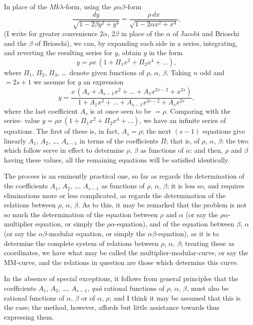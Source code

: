\documentclass[11pt,a4paper]{book}
\begin{document}
In place of the $Mk\lambda$-form, using the $\rho\alpha\beta$-form
\[
\frac{dy}{\sqrt{1 - 2\beta y^2 + y^4}} = \frac{\rho\, dx}{\sqrt{1 - 2\alpha x^2 + x^4}},
\]
(I write for greater convenience $2\alpha$, $2\beta$ in place of the $\alpha$ of Jacobi and Brioschi and
the $\beta$ of Brioschi), we can, by expanding each side in a series, integrating, and
reverting the resulting series for $y$, obtain $y$ in the form
\[
y = \rho x\, (1 + \Pi_1 x^2 + \Pi_2 x^4 + \ldots),
\]
where $\Pi_1$, $\Pi_2$, $\Pi_3$, \ldots\ denote given functions of $\rho$, $\alpha$, $\beta$. Taking $n$ odd and $= 2s + 1$
we assume for $y$ an expression
\[
y = \frac{x\, (A_s + A_{s-1} x^2 + \ldots + A_1 x^{2s-2} + x^{2s})}
{1 + A_1 x^2 + \ldots + A_{s-1} x^{2s-2} + A_s x^{2s}},
\]
where the last coefficient $A_s$ is at once seen to be $= \rho$. Comparing with the series-
value $y = \rho x\, (1 + \Pi_1 x^2 + \Pi_2 x^4 + \ldots)$, we have an infinite series of equations.
The first of these is, in fact, $A_s = \rho$; the next $(s-1)$ equations give linearly $A_1$, $A_2$, \ldots,
$A_{s-1}$ in terms of the coefficients $\Pi$; that is, of $\rho$, $\alpha$, $\beta$: the two which follow serve in
effect to determine $\rho$, $\beta$ as functions of $\alpha$: and then, $\rho$ and $\beta$ having these values,
all the remaining equations will be satisfied identically.

The process is an eminently practical one, so far as regards the determination
of the coefficients $A_1$, $A_2$, \ldots, $A_{s-1}$ as functions of $\rho$, $\alpha$, $\beta$; it is less so, and requires
eliminations more or less complicated, as regards the determination of the relations
between $\rho$, $\alpha$, $\beta$. As to this, it may be remarked that the problem is not so much
the determination of the equation between $\rho$ and $\alpha$ (or say the $\rho\alpha$-multiplier equation,
or simply the $\rho\alpha$-equation), and of the equation between $\beta$, $\alpha$ (or say the
$\alpha\beta$-modular equation, or simply the $\alpha\beta$-equation), as it is to determine the complete
system of relations between $\rho$, $\alpha$, $\beta$; treating these as coordinates, we have what may
be called the multiplier-modular-curve, or say the MM-curve, and the relations in
question are those which determine this curve.

In the absence of special exceptions, it follows from general principles that the
coefficients $A_1$, $A_2$, \ldots, $A_{s-1}$, \textit{qu\`{a}} rational functions of $\rho$, $\alpha$, $\beta$, must also be rational
functions of $\alpha$, $\beta$ or of $\alpha$, $\rho$; and I think it may be assumed that this is the case;
the method, however, affords but little assistance towards thus expressing them.
\end{document}
